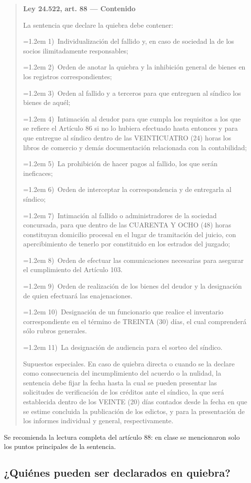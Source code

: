 \documentclass[12pt,oneside]{book}
\newenvironment{articulo}[1]
  {\begin{quote}\small\textbf{#1}\par\smallskip}
  {\end{quote}}
\newcommand{\inciso}[2]{\par\noindent\hangindent=1.2em\hangafter=1 #1)~#2}
\begin{document}
\begin{articulo}{Ley 24.522, art. 88 --- Contenido}
La sentencia que declare la quiebra debe contener:
\inciso{1}{Individualización del fallido y, en caso de sociedad la de los socios ilimitadamente responsables;}
\inciso{2}{Orden de anotar la quiebra y la inhibición general de bienes en los registros correspondientes;}
\inciso{3}{Orden al fallido y a terceros para que entreguen al síndico los bienes de aquél;}
\inciso{4}{Intimación al deudor para que cumpla los requisitos a los que se refiere el Artículo 86 si no lo hubiera efectuado hasta entonces y para que entregue al síndico dentro de las VEINTICUATRO (24) horas los libros de comercio y demás documentación relacionada con la contabilidad;}
\inciso{5}{La prohibición de hacer pagos al fallido, los que serán ineficaces;}
\inciso{6}{Orden de interceptar la correspondencia y de entregarla al síndico;}
\inciso{7}{Intimación al fallido o administradores de la sociedad concursada, para que dentro de las CUARENTA Y OCHO (48) horas constituyan domicilio procesal en el lugar de tramitación del juicio, con apercibimiento de tenerlo por constituido en los estrados del juzgado;}
\inciso{8}{Orden de efectuar las comunicaciones necesarias para asegurar el cumplimiento del Artículo 103.}
\inciso{9}{Orden de realización de los bienes del deudor y la designación de quien efectuará las enajenaciones.}
\inciso{10}{Designación de un funcionario que realice el inventario correspondiente en el término de TREINTA (30) días, el cual comprenderá sólo rubros generales.}
\inciso{11}{La designación de audiencia para el sorteo del síndico.}

Supuestos especiales. En caso de quiebra directa o cuando se la declare como consecuencia del incumplimiento del acuerdo o la nulidad, la sentencia debe fijar la fecha hasta la cual se pueden presentar las solicitudes de verificación de los créditos ante el síndico, la que será establecida dentro de los VEINTE (20) días contados desde la fecha en que se estime concluida la publicación de los edictos, y para la presentación de los informes individual y general, respectivamente.
\end{articulo}

\begin{note}
Se recomienda la lectura completa del artículo 88: en clase se mencionaron solo los puntos principales de la sentencia.
\end{note}

\subsection{¿Quiénes pueden ser declarados en quiebra?}
\end{document}
